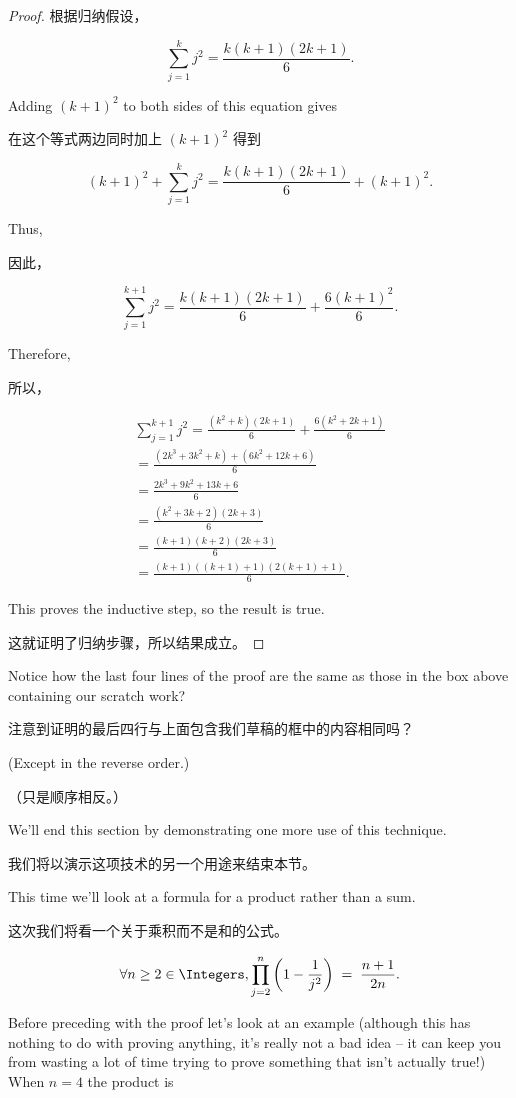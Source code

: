 \begin{proof}
根据归纳假设，

\[ \sum_{j=1}^k j^2 = \frac{k(k+1)(2k+1)}{6}.
\]

Adding $(k+1)^2$ to both sides of this equation gives

在这个等式两边同时加上 $(k+1)^2$ 得到

\[ (k+1)^2 + \sum_{j=1}^k j^2 = \frac{k(k+1)(2k+1)}{6} + (k+1)^2.
\]

Thus,

因此，

\[ \sum_{j=1}^{k+1} j^2 = \frac{k(k+1)(2k+1)}{6} + \frac{6(k+1)^2}{6}. \]

Therefore,

所以，

\begin{gather*}
\sum_{j=1}^{k+1} j^2 = \frac{(k^2+k)(2k+1)}{6} + \frac{6(k^2+2k+1)}{6} \\
 = \frac{(2k^3+3k^2+k)+(6k^2+12k+6)}{6}\\
 = \frac{2k^3+9k^2+13k+6}{6}\\
 = \frac{(k^2+3k+2)(2k+3)}{6}\\
 = \frac{(k+1)(k+2)(2k+3)}{6} \\
 = \frac{(k+1)((k+1)+1)(2(k+1)+1)}{6}.
\end{gather*}

This proves the inductive step, so the result is true.

这就证明了归纳步骤，所以结果成立。
\end{proof}

Notice how the last four lines of the proof are the same as those in
the box above containing our scratch work?

注意到证明的最后四行与上面包含我们草稿的框中的内容相同吗？

(Except in the reverse order.)

（只是顺序相反。）

We'll end this section by demonstrating one more use of this technique.

我们将以演示这项技术的另一个用途来结束本节。

This time we'll look at a formula for a product rather than a sum.

这次我们将看一个关于乘积而不是和的公式。

\begin{thm} $$\forall n \geq 2 \in \Integers, \prod_{j=2}^n \left( 1 - \frac{1}{j^2} \right) \;  = \; \frac{n+1}{2n}.$$
\end{thm}

Before preceding with the proof let's look at an example (although this 
has nothing to do with proving anything, it's really not a bad idea -- it can
keep you from wasting a lot of time trying to prove something that isn't 
actually true!)  When $n = 4$ the product is

